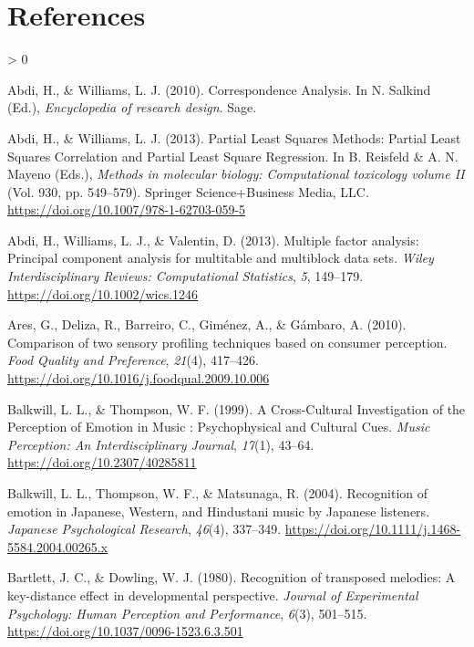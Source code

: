 \documentclass[
  english,
  man,floatsintext]{apa6}
\newlength{\cslhangindent}
\newenvironment{CSLReferences}[2] %
 {%
  \setlength{\parindent}{0pt}
  \ifodd #1 \everypar{\setlength{\hangindent}{\cslhangindent}}\ignorespaces\fi
  \ifnum #2 > 0
  \setlength{\parskip}{#2\baselineskip}
  \fi
 }%
 {}
\begin{document}
\hypertarget{references}{%
\section{References}\label{references}}

\begingroup
\setlength{\parindent}{-0.5in}
\setlength{\leftskip}{0.5in}

\hypertarget{refs}{}
\begin{CSLReferences}{1}{0}
\leavevmode\hypertarget{ref-Abdi2010d}{}%
Abdi, H., \& Williams, L. J. (2010). {Correspondence Analysis}. In N. Salkind (Ed.), \emph{Encyclopedia of research design}. Sage.

\leavevmode\hypertarget{ref-Abdi2013a}{}%
Abdi, H., \& Williams, L. J. (2013). {Partial Least Squares Methods: Partial Least Squares Correlation and Partial Least Square Regression}. In B. Reisfeld \& A. N. Mayeno (Eds.), \emph{Methods in molecular biology: Computational toxicology volume II} (Vol. 930, pp. 549--579). Springer Science+Business Media, LLC. \url{https://doi.org/10.1007/978-1-62703-059-5}

\leavevmode\hypertarget{ref-Abdi2013}{}%
Abdi, H., Williams, L. J., \& Valentin, D. (2013). {Multiple factor analysis: Principal component analysis for multitable and multiblock data sets}. \emph{Wiley Interdisciplinary Reviews: Computational Statistics}, \emph{5}, 149--179. \url{https://doi.org/10.1002/wics.1246}

\leavevmode\hypertarget{ref-Ares2010}{}%
Ares, G., Deliza, R., Barreiro, C., Giménez, A., \& Gámbaro, A. (2010). {Comparison of two sensory profiling techniques based on consumer perception}. \emph{Food Quality and Preference}, \emph{21}(4), 417--426. \url{https://doi.org/10.1016/j.foodqual.2009.10.006}

\leavevmode\hypertarget{ref-Balkwill1999}{}%
Balkwill, L. L., \& Thompson, W. F. (1999). {A Cross-Cultural Investigation of the Perception of Emotion in Music : Psychophysical and Cultural Cues}. \emph{Music Perception: An Interdisciplinary Journal}, \emph{17}(1), 43--64. \url{https://doi.org/10.2307/40285811}

\leavevmode\hypertarget{ref-Balkwill2004}{}%
Balkwill, L. L., Thompson, W. F., \& Matsunaga, R. (2004). {Recognition of emotion in Japanese, Western, and Hindustani music by Japanese listeners}. \emph{Japanese Psychological Research}, \emph{46}(4), 337--349. \url{https://doi.org/10.1111/j.1468-5584.2004.00265.x}

\leavevmode\hypertarget{ref-Bartlett1980a}{}%
Bartlett, J. C., \& Dowling, W. J. (1980). {Recognition of transposed melodies: A key-distance effect in developmental perspective}. \emph{Journal of Experimental Psychology: Human Perception and Performance}, \emph{6}(3), 501--515. \url{https://doi.org/10.1037/0096-1523.6.3.501}


\end{CSLReferences}
\end{document}
